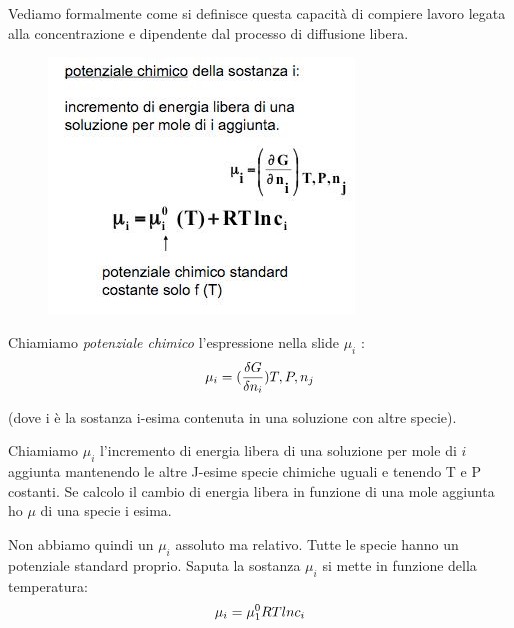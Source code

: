 \documentclass[a4paper,12pt]{article}
\begin{document}
Vediamo formalmente come si definisce questa capacità di compiere lavoro legata alla concentrazione e dipendente dal processo di diffusione libera.
\begin{figure}[H]
\centering
\includegraphics[scale=0.4]{immagine/pot_chimico.jpg}
\caption{}
\end{figure}

Chiamiamo \emph{potenziale chimico} l'espressione nella slide $\mu_{i}$ :
\begin{equation}
\centering
\mu_{i}=(\frac{\delta G}{\delta n_{i}}) T, P, n_{j}
\end{equation}

(dove i è la sostanza i-esima contenuta in una soluzione con altre specie). 

Chiamiamo $\mu_{i}$ l’incremento di energia libera di una soluzione per mole di $i$ aggiunta mantenendo le altre J-esime specie chimiche uguali e tenendo T e P costanti.
Se calcolo il cambio di energia libera in funzione di una mole aggiunta ho $\mu$ di una specie i esima.

Non abbiamo quindi un $\mu_{i}$ assoluto ma relativo.
Tutte le specie hanno un potenziale standard proprio.
Saputa la sostanza $\mu_{i}$ si mette in funzione della temperatura:
\begin{equation}
\centering
\mu_{i}=\mu_{1}^{0} RT ln c_{i}
\end{equation}
\end{document}
